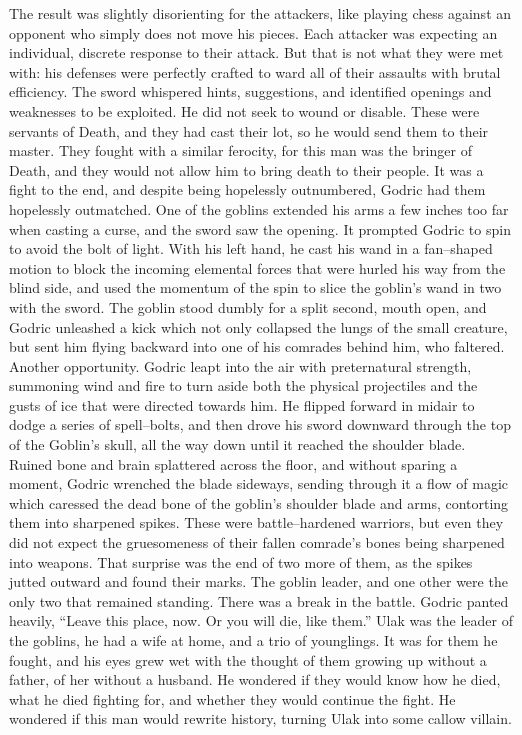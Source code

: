 The result was slightly disorienting for the attackers, like playing chess against an opponent who simply does not move his pieces. Each attacker was expecting an individual, discrete response to their attack. But that is not what they were met with: his defenses were perfectly crafted to ward all of their assaults with brutal efficiency. The sword whispered hints, suggestions, and identified openings and weaknesses to be exploited.
\SmallVSpace
He did not seek to wound or disable. These were servants of Death, and they had cast their lot, so he would send them to their master. They fought with a similar ferocity, for this man was the bringer of Death, and they would not allow him to bring death to their people.
\SomeVSpace
It was a fight to the end, and despite being hopelessly outnumbered, Godric had them hopelessly outmatched. One of the goblins extended his arms a few inches too far when casting a curse, and the sword saw the opening. It prompted Godric to spin to avoid the bolt of light. With his left hand, he cast his wand in a fan\mbox{--}shaped motion to block the incoming elemental forces that were hurled his way from the blind side, and used the momentum of the spin to slice the goblin’s wand in two with the sword.
\SmallVSpace
The goblin stood dumbly for a split second, mouth open, and Godric unleashed a kick which not only collapsed the lungs of the small creature, but sent him flying backward into one of his comrades behind him, who faltered. Another opportunity. Godric leapt into the air with preternatural strength, summoning wind and fire to turn aside both the physical projectiles and the gusts of ice that were directed towards him. He flipped forward in midair to dodge a series of spell\mbox{--}bolts, and then drove his sword downward through the top of the Goblin’s skull, all the way down until it reached the shoulder blade.
\SmallVSpace
Ruined bone and brain splattered across the floor, and without sparing a moment, Godric wrenched the blade sideways, sending through it a flow of magic which caressed the dead bone of the goblin’s shoulder blade and arms, contorting them into sharpened spikes.
\SmallVSpace
These were battle\mbox{--}hardened warriors, but even they did not expect the gruesomeness of their fallen comrade’s bones being sharpened into weapons. That surprise was the end of two more of them, as the spikes jutted outward and found their marks. The goblin leader, and one other were the only two that remained standing. There was a break in the battle.
\SmallVSpace
Godric panted heavily, “Leave this place, now. Or you will die, like them.”
\SmallVSpace
Ulak was the leader of the goblins, he had a wife at home, and a trio of younglings. It was for them he fought, and his eyes grew wet with the thought of them growing up without a father, of her without a husband. He wondered if they would know how he died, what he died fighting for, and whether they would continue the fight. He wondered if this man would rewrite history, turning Ulak into some callow villain.

